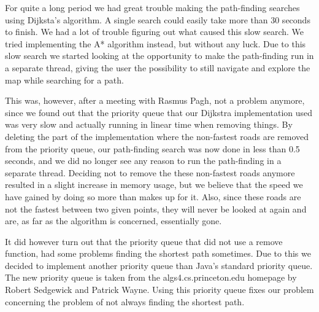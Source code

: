 For quite a long period we had great trouble making the path-finding searches using Dijksta's algorithm. A single search could easily take more than 30 seconds to finish. We had a lot of trouble figuring out what caused this slow search. We tried implementing the A* algorithm instead, but without any luck. Due to this slow search we started looking at the opportunity to make the path-finding run in a separate thread, giving the user the possibility to still navigate and explore the map while searching for a path. 

This was, however, after a meeting with Rasmus Pagh, not a problem anymore, since we found out that the priority queue that our Dijkstra implementation used was very slow and actually running in linear time when removing things. By deleting the part of the implementation where the non-fastest roads are removed from the priority queue, our path-finding search was now done in less than 0.5 seconds, and we did no longer see any reason to run the path-finding in a separate thread. Deciding not to remove the these non-fastest roads anymore resulted in a slight increase in memory usage, but we believe that the speed we have gained by doing so more than makes up for it. Also, since these roads are not the fastest between two given points, they will never be looked at again and are, as far as the algorithm is concerned, essentially gone.

It did however turn out that the priority queue that did not use a remove function, had some problems finding the shortest path sometimes. Due to this we decided to implement another priority queue than Java's standard priority queue. The new priority queue is taken from the algs4.cs.princeton.edu homepage by Robert Sedgewick and Patrick Wayne. Using this priority queue fixes our problem concerning the problem of not always finding the shortest path.
